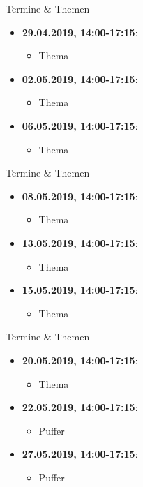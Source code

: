 \begin{frame}{Termine \& Themen}
	\begin{itemize}
		\item \textbf{29.04.2019, 14:00-17:15}:
		\begin{itemize}
			\item Thema
		\end{itemize}
		\item \textbf{02.05.2019, 14:00-17:15}:
		\begin{itemize}
			\item Thema
		\end{itemize}
		\item \textbf{06.05.2019, 14:00-17:15}:
		\begin{itemize}
			\item Thema
		\end{itemize}
	\end{itemize}
\end{frame}

\begin{frame}{Termine \& Themen}
	\begin{itemize}
		\item \textbf{08.05.2019, 14:00-17:15}:
		\begin{itemize}
			\item Thema
		\end{itemize}
		\item \textbf{13.05.2019, 14:00-17:15}:
		\begin{itemize}
			\item Thema
		\end{itemize}
		\item \textbf{15.05.2019, 14:00-17:15}:
		\begin{itemize}
			\item Thema
		\end{itemize}
	\end{itemize}
\end{frame}

\begin{frame}{Termine \& Themen}
	\begin{itemize}
		\item \textbf{20.05.2019, 14:00-17:15}:
		\begin{itemize}
			\item Thema
		\end{itemize}
		\item \textbf{22.05.2019, 14:00-17:15}:
		\begin{itemize}
			\item Puffer
		\end{itemize}
		\item \textbf{27.05.2019, 14:00-17:15}:
		\begin{itemize}
			\item Puffer
		\end{itemize}
	\end{itemize}
\end{frame}

